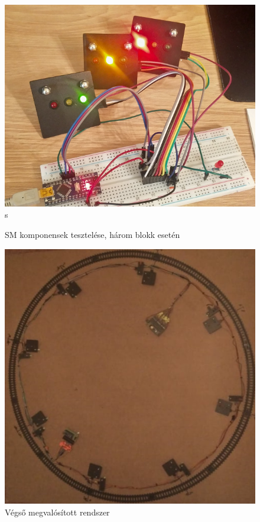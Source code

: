\documentclass[a4paper,12pt]{article}
\begin{document}
\begin{figure}[htp]
\begin{minipage}{0.32\textwidth}
        \includegraphics[width=\linewidth]{images/sm_test_3.png}s
    \end{minipage}
    \caption[SM teszt]{SM komponensek tesztelése, három blokk esetén}
    \label{fig:smtest}
\end{figure}


\begin{figure}[!htp]
    \centering
    \includegraphics[width=0.7\linewidth]{images/realized_system.png}
    \caption[Végső rendszer]{Végső megvalósított rendszer}
    \label{fig:final_system}
\end{figure}
\newpage
\end{document}

